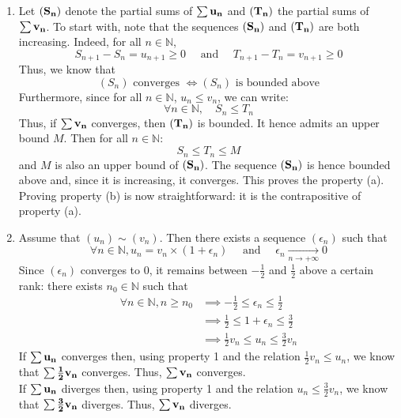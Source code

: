 \documentclass[notitlepage]{math}
\begin{document}
\begin{enumerate}
    \item Let $\bf (S_n)$ denote the partial sums of $\bf \sum u_n$ and $\bf (T_n)$ the partial sums of $\bf \sum v_n$.
    To start with, note that the sequences $\bf (S_n)$ and $\bf (T_n)$ are both increasing. Indeed, for all $n \in \mathbb{N}$,
    \[ S_{n+1} - S_n = u_{n+1} \geq 0 \quad \text{ and } \quad T_{n+1} - T_n = v_{n+1} \geq 0 \]
    Thus, we know that
    \[ (S_n) \text{ converges } \Longleftrightarrow (S_n) \text{ is bounded above} \]
    Furthermore, since for all $n \in \mathbb{N}$, $u_n \leq v_n$, we can write:
    \[ \forall n \in \mathbb{N}, \quad S_n \leq T_n \]
    Thus, if $\bf \sum v_n$ converges, then $\bf (T_n)$ is bounded.  It hence admits an upper bound $M$. Then for all $n \in \mathbb{N}$:
    \[ S_n \leq T_n \leq M \]
    and $M$ is also an upper bound of $\bf (S_n)$. The sequence $\bf (S_n)$ is hence bounded above and, since it is increasing, it converges. This proves the property (a).\\[1em]
    Proving property (b) is now straightforward: it is the contrapositive of property (a).

    \item Assume that $(u_n) \sim (v_n)$. Then there exists a sequence $(\epsilon_n)$ such that
    \[ \forall n \in \mathbb{N}, u_n = v_n \times (1 + \epsilon_n) \quad \text{ and } \quad \epsilon_n \xrightarrow[n \to +\infty]{} 0 \]
    Since $(\epsilon_n)$ converges to $0$, it remains between $-\frac{1}{2}$ and $\frac{1}{2}$ above a certain rank: there exists $n_0 \in \mathbb{N}$ such that
    \begin{align*}
        \forall n \in \mathbb{N}, n \geq n_0 &\implies -\frac{1}{2} \leq \epsilon_n \leq \frac{1}{2}\\
        &\implies \frac{1}{2} \leq 1 + \epsilon_n \leq \frac{3}{2}\\
        &\implies \frac{1}{2} v_n \leq u_n \leq \frac{3}{2} v_n
    \end{align*}
    If $\bf \sum u_n$ converges then, using property 1 and the relation $\frac{1}{2} v_n \leq u_n$, we know that $\bf \sum \frac{1}{2} v_n$ converges.
    Thus, $\bf \sum v_n$ converges.\\[1em]

    If $\bf \sum u_n$ diverges then, using property 1 and the relation $u_n \leq \frac{3}{2} v_n$, we know that $\bf \sum \frac{3}{2} v_n$ diverges.
    Thus, $\bf \sum v_n$ diverges.    
\end{enumerate}
\end{document}
